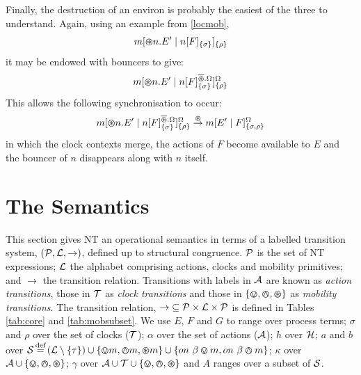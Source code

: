 Finally, the destruction of an environ is probably the easiest of the
three to understand.  Again, using an example from \ref{locmob},
\begin{equation}
{m}[ \varoast n.E^\prime\;|\;{n}[ F ]_{\{\sigma\}} ]_{\{\rho\}}
\end{equation}
it may be endowed with bouncers to give:
\begin{equation}
{m}[ \varoast n.E^\prime \;|\; {n}[ F ]^{\overline{\varoast}.\Omega}_{\{\sigma\}} ]^{\Omega}_{\{\rho\}}
\end{equation}
This allows the following synchronisation to occur:
\begin{equation}
{m}[ \varoast n.E^\prime \;|\; {n}[ F ]^{\overline{\varoast}.\Omega}_{\{\sigma\}} ]^{\Omega}_{\{\rho\}}
\stackrel{\varoast}{\rightarrow}
{m}[ E^\prime \;|\; {F} ]^{\Omega}_{\{\sigma, \rho\}}
\end{equation}
in which the clock contexts merge, the actions of $F$ become
available to $E$ and the bouncer of $n$ disappears along with $n$
itself.

\section{The Semantics}
\label{ntsemantics}

This section gives NT an operational semantics in terms of a labelled
transition system, $(\text{$\mathcal{P}$}, \text{$\mathcal{L}$}, \rightarrow)$, defined up to
structural congruence.  $\text{$\mathcal{P}$}$ is the set of NT expressions;
$\text{$\mathcal{L}$}$ the alphabet comprising actions, clocks and mobility
primitives; and $\rightarrow$ the transition relation.  Transitions
with labels in $\text{$\mathcal{A}$}$ are known as \emph{action transitions},
those in $\text{$\mathcal{T}$}$ as \emph{clock transitions} and those in $\text{$\{ \varovee, \varowedge , \varoast\}$}$
as \emph{mobility transitions}.  The transition relation,
$\mathop{\rightarrow} \mathrel{\subseteq} \text{$\mathcal{P}$} \times \text{$\mathcal{L}$} \times
\text{$\mathcal{P}$}$ is defined in Tables \ref{tab:core} and
\ref{tab:mobsubset}.  We use $E$, $F$ and $G$ to range over process
terms; $\sigma$ and $\rho$ over the set of clocks ($\text{$\mathcal{T}$}$);
$\alpha$ over the set of actions ($\text{$\mathcal{A}$}$); $h$ over $\text{$\mathcal{H}$}$;
$a$ and $b$ over $\text{$\mathcal{S}$} \operatorname{\stackrel{\textrm{def}}{=}} \left(\text{$\mathcal{L}$} \setminus
\{\tau\}\right) \cup \{ \varovee m, \varowedge m, \varoast m \} \cup \{
on\ \beta \varovee m, on\ \beta \varowedge m \} $; $\kappa$ over $\text{$\mathcal{A}$}
\cup \text{$\{ \varovee, \varowedge , \varoast\}$}$; $\gamma$ over $\text{$\mathcal{A}$} \cup \text{$\mathcal{T}$} \cup \text{$\{ \varovee, \varowedge , \varoast\}$}$
and $A$ ranges over a subset of $\text{$\mathcal{S}$}$.

